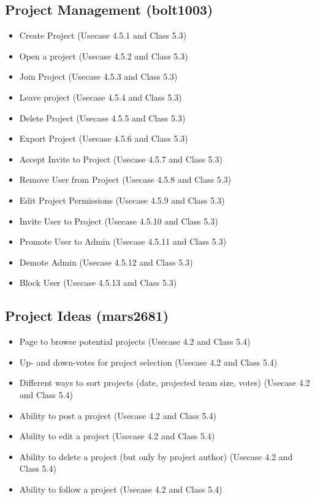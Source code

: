 \documentclass[11pt]{report}
\begin{document}
    \subsection{Project Management (bolt1003)}
        \begin{itemize}
            \item Create Project (Usecase 4.5.1 and Class 5.3)
            \item Open a project (Usecase 4.5.2 and Class 5.3)
            \item Join Project (Usecase 4.5.3 and Class 5.3)
            \item Leave project (Usecase 4.5.4 and Class 5.3)
            \item Delete Project (Usecase 4.5.5 and Class 5.3)
            \item Export Project (Usecase 4.5.6 and Class 5.3)
            \item Accept Invite to Project (Usecase 4.5.7 and Class 5.3)
            \item Remove User from Project (Usecase 4.5.8 and Class 5.3)
            \item Edit Project Permissions (Usecase 4.5.9 and Class 5.3)
            \item Invite User to Project (Usecase 4.5.10 and Class 5.3)
            \item Promote User to Admin (Usecase 4.5.11 and Class 5.3)
            \item Demote Admin (Usecase 4.5.12 and Class 5.3)
            \item Block User (Usecase 4.5.13 and Class 5.3)
        \end{itemize}
    \subsection{Project Ideas (mars2681)}
        \begin{itemize}
            \item Page to browse potential projects (Usecase 4.2 and Class 5.4)
            \item Up- and down-votes for project selection (Usecase 4.2 and Class 5.4)
            \item Different ways to sort projects (date, projected team size, votes) (Usecase 4.2 and Class 5.4)
            \item Ability to post a project (Usecase 4.2 and Class 5.4)
            \item Ability to edit a project (Usecase 4.2 and Class 5.4)
            \item Ability to delete a project (but only by project author) (Usecase 4.2 and Class 5.4)
            \item Ability to follow a project (Usecase 4.2 and Class 5.4)
        \end{itemize}
\end{document}
